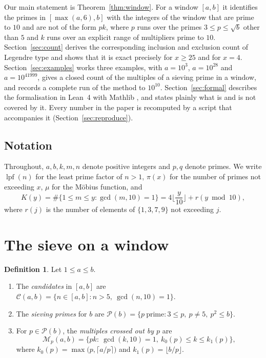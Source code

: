 \documentclass[11pt]{amsart}
\theoremstyle{definition}
\newtheorem{definition}[theorem]{Definition}
\theoremstyle{remark}
\newcommand{\Cand}{\mathcal{C}}
\newcommand{\Sv}{\mathcal{P}}
\newcommand{\Mult}{\mathcal{M}}
\newcommand{\lpf}{\operatorname{lpf}}
\begin{document}
Our main statement is Theorem~\ref{thm:window}. For a window $[a,b]$ it identifies the primes in $[\max(a,6),b]$ with the integers of the window that are prime to $10$ and are not of the form $pk$, where $p$ runs over the primes $3\le p\le\sqrt b$ other than $5$ and $k$ runs over an explicit range of multipliers prime to $10$. Section~\ref{sec:count} derives the corresponding inclusion and exclusion count of Legendre type and shows that it is exact precisely for $x\ge 25$ and for $x=4$. Section~\ref{sec:examples} works three examples, with $a=10^3$, $a=10^{28}$ and $a=10^{41999}$, gives a closed count of the multiples of a sieving prime in a window, and records a complete run of the method to $10^{10}$. Section~\ref{sec:formal} describes the formalisation in Lean~4 \cite{Lean4} with Mathlib \cite{Mathlib2020}, and states plainly what is and is not covered by it. Every number in the paper is recomputed by a script that accompanies it (Section~\ref{sec:reproduce}).

\subsection*{Notation}
Throughout, $a,b,k,m,n$ denote positive integers and $p,q$ denote primes. We write $\lpf(n)$ for the least prime factor of $n>1$, $\pi(x)$ for the number of primes not exceeding $x$, $\mu$ for the M\"obius function, and
\[
K(y)=\#\{1\le m\le y:\gcd(m,10)=1\}=4\Big\lfloor\frac{y}{10}\Big\rfloor+r(y\bmod 10),
\]
where $r(j)$ is the number of elements of $\{1,3,7,9\}$ not exceeding $j$.

\section{The sieve on a window}\label{sec:window}

\begin{definition}\label{def:sets}
Let $1\le a\le b$.
\begin{enumerate}
\item The \emph{candidates} in $[a,b]$ are $\Cand(a,b)=\{n\in[a,b]:n>5,\ \gcd(n,10)=1\}$.
\item The \emph{sieving primes} for $b$ are $\Sv(b)=\{p\ \text{prime}:3\le p,\ p\ne 5,\ p^2\le b\}$.
\item For $p\in\Sv(b)$, the \emph{multiples crossed out by $p$} are
\[
\Mult_p(a,b)=\{pk:\ \gcd(k,10)=1,\ k_0(p)\le k\le k_1(p)\},
\]
where $k_0(p)=\max\big(p,\lceil a/p\rceil\big)$ and $k_1(p)=\lfloor b/p\rfloor$.
\end{enumerate}
\end{definition}
\end{document}
